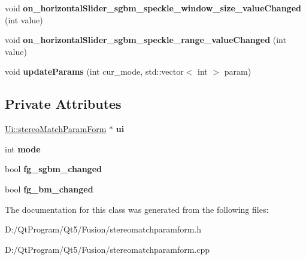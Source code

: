 \begin{DoxyCompactItemize}
\item 
\hypertarget{classstereo_match_param_form_ae2b3dc9e2aabef8bac2c982456d3b26a}{}void {\bfseries on\+\_\+horizontal\+Slider\+\_\+sgbm\+\_\+speckle\+\_\+window\+\_\+size\+\_\+value\+Changed} (int value)\label{classstereo_match_param_form_ae2b3dc9e2aabef8bac2c982456d3b26a}

\item 
\hypertarget{classstereo_match_param_form_a97ac246adec788de95d8a44d435e610b}{}void {\bfseries on\+\_\+horizontal\+Slider\+\_\+sgbm\+\_\+speckle\+\_\+range\+\_\+value\+Changed} (int value)\label{classstereo_match_param_form_a97ac246adec788de95d8a44d435e610b}

\item 
\hypertarget{classstereo_match_param_form_a51f43a349453d57e03693f61d8006a2a}{}void {\bfseries update\+Params} (int cur\+\_\+mode, std\+::vector$<$ int $>$ param)\label{classstereo_match_param_form_a51f43a349453d57e03693f61d8006a2a}

\end{DoxyCompactItemize}
\subsection*{Private Attributes}
\begin{DoxyCompactItemize}
\item 
\hypertarget{classstereo_match_param_form_a9d27a67d083c85f3ae2490f7344a0fd2}{}\hyperlink{class_ui_1_1stereo_match_param_form}{Ui\+::stereo\+Match\+Param\+Form} $\ast$ {\bfseries ui}\label{classstereo_match_param_form_a9d27a67d083c85f3ae2490f7344a0fd2}

\item 
\hypertarget{classstereo_match_param_form_a0225a335c88a22904bbb0cd1d305c541}{}int {\bfseries mode}\label{classstereo_match_param_form_a0225a335c88a22904bbb0cd1d305c541}

\item 
\hypertarget{classstereo_match_param_form_ae01ea10b7cb68a3e104ec20f0bf86fdd}{}bool {\bfseries fg\+\_\+sgbm\+\_\+changed}\label{classstereo_match_param_form_ae01ea10b7cb68a3e104ec20f0bf86fdd}

\item 
\hypertarget{classstereo_match_param_form_a1980626db05cb9aa6652d30540a3ccb1}{}bool {\bfseries fg\+\_\+bm\+\_\+changed}\label{classstereo_match_param_form_a1980626db05cb9aa6652d30540a3ccb1}

\end{DoxyCompactItemize}


The documentation for this class was generated from the following files\+:\begin{DoxyCompactItemize}
\item 
D\+:/\+Qt\+Program/\+Qt5/\+Fusion/stereomatchparamform.\+h\item 
D\+:/\+Qt\+Program/\+Qt5/\+Fusion/stereomatchparamform.\+cpp\end{DoxyCompactItemize}
